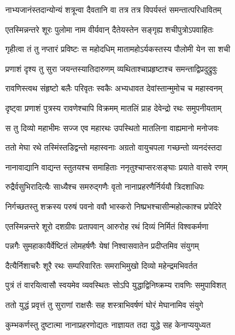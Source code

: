\twolineshloka
{नाभ्यजानंस्तदान्योन्यं शत्रून्वा दैवतानि वा}
{तत्र तत्र विपर्यस्तं समन्तात्परिधावितम्} %

\twolineshloka
{एतस्मिन्नन्तरे शूरः पुलोमा नाम वीर्यवान्}
{दैतेयस्तेन सङ्गृह्य शचीपुत्रोऽपवाहितः} %

\twolineshloka
{गृहीत्वा तं तु नप्तारं प्रविष्टः स महोदधिम्}
{मातामहोऽर्यकस्तस्य पौलोमी येन सा शची} %

\twolineshloka
{प्रणाशं दृश्य तु सुरा जयन्तस्यातिदारुणम्}
{व्यथिताश्चाप्रहृष्टाश्च समन्ताद्विप्रदुद्रुवुः} %

\twolineshloka
{रावणिस्त्वथ संहृष्टो बलैः परिवृतः स्वकैः}
{अभ्यधावत देवांस्तान्मुमोच च महास्वनम्} %

\twolineshloka
{दृष्ट्वा प्रणाशं पुत्रस्य रावणेश्चापि विक्रमम्}
{मातलिं प्राह देवेन्द्रो रथः समुपनीयताम्} %

\twolineshloka
{स तु दिव्यो महाभीमः सज्ज एव महारथः}
{उपस्थितो मातलिना वाह्यमानो मनोजवः} %

\twolineshloka
{ततो मेघा रथे तस्मिंस्तडिद्वन्तो महास्वनाः}
{अग्रतो वायुचपला गच्छन्तो व्यनदंस्तदा} %

\twolineshloka
{नानावाद्यानि वाद्यन्त स्तुतयश्च समाहिताः}
{ननृतुश्चाप्सरःसङ्घाः प्रयाते वासवे रणम्} %

\twolineshloka
{रुद्रैर्वसुभिरादित्यैः साध्यैश्च समरुद्गणैः}
{वृतो नानाप्रहरणैर्निर्ययौ त्रिदशाधिपः} %

\twolineshloka
{निर्गच्छतस्तु शक्रस्य परुषं पवनो ववौ}
{भास्करो निष्प्रभश्चासीन्महोल्काश्च प्रपेदिरे} %

\twolineshloka
{एतस्मिन्नन्तरे शूरो दशग्रीवः प्रतापवान्}
{आरुरोह रथं दिव्यं निर्मितं विश्वकर्मणा} %

\twolineshloka
{पन्नगैः सुमहाकायैर्वेष्टितं लोमहर्षणैः}
{येषां निश्वासवातेन प्रदीप्तमिव संयुगम्} %

\twolineshloka
{दैत्यैर्निशाचरैः शूरै रथः सम्परिवारितः}
{समराभिमुखो दिव्यो महेन्द्रमभिवर्तत} %

\twolineshloka
{पुत्रं तं वारयित्वासौ स्वयमेव व्यवस्थितः}
{सोऽपि युद्धाद्विनिष्क्रम्य रावणिः समुपाविशत्} %

\twolineshloka
{ततो युद्धं प्रवृत्तं तु सुराणां राक्षसैः सह}
{शस्त्राभिवर्षणं घोरं मेघानामिव संयुगे} %

\twolineshloka
{कुम्भकर्णस्तु दुष्टात्मा नानाप्रहरणोद्यतः}
{नाज्ञायत तदा युद्धे सह केनाप्ययुध्यत} %


